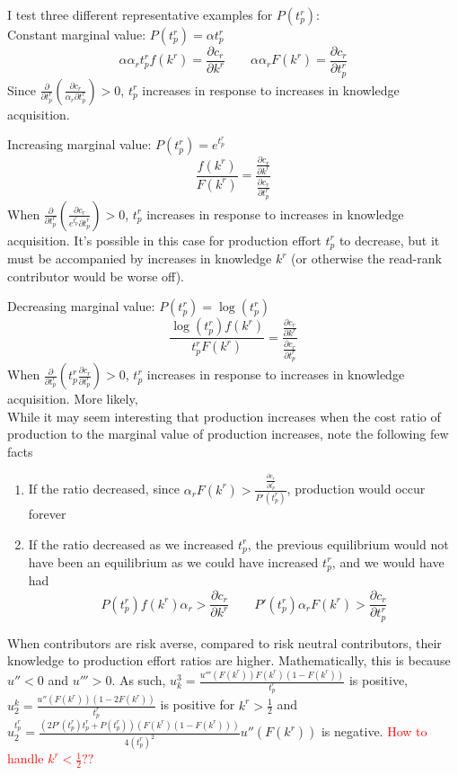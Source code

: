 \documentclass[source/paper/main.tex]{subfiles}
\begin{document}
I test three different representative examples for $P(t_p^r)$:\\
Constant marginal value: $P(t_p^r) = \alpha t_p^r$
$$\alpha \alpha_r  t_p^r f(k^r)= \frac{\partial c_r}{\partial k^r} \qquad \alpha \alpha_r F(k^r) = \frac{\partial c_r}{\partial t_p^r}$$
Since $\frac{\partial }{\partial t_p^r}(\frac{\partial c_r}{\alpha_r \partial t_p^r})>0$, $t_p^r$ increases in response to increases in knowledge acquisition. 
 
 Increasing marginal value: $P(t_p^r) = e^{t_p^r}$
$$\frac{f(k^r)}{F(k^r)} = \frac{\frac{\partial c_r}{\partial k^r}}{\frac{\partial c_r}{\partial t_p^r}}$$
When $\frac{\partial }{\partial t_p^r}(\frac{\partial c_r}{e^{t_p^r} \partial t_p^r})>0$, $t_p^r$ increases in response to increases in knowledge acquisition. It's possible in this case for production effort $t_p^r$ to decrease, but it must be accompanied by increases in knowledge $k^r$ (or otherwise the read-rank contributor would be worse off). 

Decreasing marginal value: $P(t_p^r) = \log(t_p^r)$
$$\frac{\log(t_p^r)f(k^r)}{t_p^rF(k^r)} = \frac{\frac{\partial c_r}{\partial k^r}}{\frac{\partial c_r}{\partial t_p^r}}$$
When $\frac{\partial }{\partial t_p^r}(t_p^r \frac{\partial c_r}{\partial t_p^r})>0$, $t_p^r$ increases in response to increases in knowledge acquisition. More likely, \\


While it may seem interesting that production increases when the cost ratio of production to the marginal value of production increases, note the following few facts
\begin{enumerate}
    \item If the ratio decreased, since $\alpha_r F(k^r) > \frac{\frac{\partial c_r}{\partial t_p^r}}{P'(t_p^r)}$, production would occur forever
    \item If the ratio decreased as we increased $t_p^r$, the previous equilibrium would not have been an equilibrium as we could have increased $t_p^r$, and we would have had
    $$P(t_p^r)f(k^r)\alpha_r > \frac{\partial c_r}{\partial k^r} \qquad P'(t_p^r)\alpha_r F(k^r) > \frac{\partial c_r}{\partial t_p^r}$$
\end{enumerate}
When contributors are risk averse, compared to risk neutral contributors, their knowledge to production effort ratios are higher. Mathematically, this is because $u'' < 0$ and $u''' > 0$. As such,
$u_k^3 = \frac{u'''(F(k^r))F(k^r)(1-F(k^r))}{t_p^r}$ is positive, $u_2^k = \frac{u''(F(k^r))  (1-2F(k^r))}{t_p^r}$ is positive for $k^r > \frac12$ and $u_2^{t_p^r} = \frac{(2P'(t_p^r)t_p^r + P(t_p^r))(F(k^r)(1-F(k^r)))}{4(t_p^r)^2}u''(F(k^r))$ is negative. \textcolor{red}{How to handle $k^r< \frac12??$}
\end{document}
